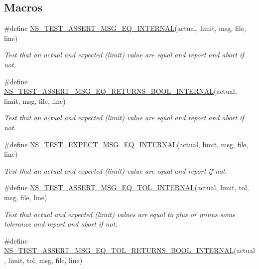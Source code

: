 \subsection*{Macros}
\begin{DoxyCompactItemize}
\item 
\#define \hyperlink{group__testingimpl_gaa9d54a0bd3ffaa7f4db82c4a6c1fb83b}{N\+S\+\_\+\+T\+E\+S\+T\+\_\+\+A\+S\+S\+E\+R\+T\+\_\+\+M\+S\+G\+\_\+\+E\+Q\+\_\+\+I\+N\+T\+E\+R\+N\+AL}(actual,  limit,  msg,  file,  line)
\begin{DoxyCompactList}\small\item\em Test that an actual and expected (limit) value are equal and report and abort if not. \end{DoxyCompactList}\item 
\#define \hyperlink{group__testingimpl_gaa154d45ddff16a28ea0a9f3fe890591d}{N\+S\+\_\+\+T\+E\+S\+T\+\_\+\+A\+S\+S\+E\+R\+T\+\_\+\+M\+S\+G\+\_\+\+E\+Q\+\_\+\+R\+E\+T\+U\+R\+N\+S\+\_\+\+B\+O\+O\+L\+\_\+\+I\+N\+T\+E\+R\+N\+AL}(actual,  limit,  msg,  file,  line)
\begin{DoxyCompactList}\small\item\em Test that an actual and expected (limit) value are equal and report and abort if not. \end{DoxyCompactList}\item 
\#define \hyperlink{group__testingimpl_gaf35a8f7e8a9a1eb011fa6fb33ea721a3}{N\+S\+\_\+\+T\+E\+S\+T\+\_\+\+E\+X\+P\+E\+C\+T\+\_\+\+M\+S\+G\+\_\+\+E\+Q\+\_\+\+I\+N\+T\+E\+R\+N\+AL}(actual,  limit,  msg,  file,  line)
\begin{DoxyCompactList}\small\item\em Test that an actual and expected (limit) value are equal and report if not. \end{DoxyCompactList}\item 
\#define \hyperlink{group__testingimpl_ga48c926819b2c033fb5a4c97177efbed7}{N\+S\+\_\+\+T\+E\+S\+T\+\_\+\+A\+S\+S\+E\+R\+T\+\_\+\+M\+S\+G\+\_\+\+E\+Q\+\_\+\+T\+O\+L\+\_\+\+I\+N\+T\+E\+R\+N\+AL}(actual,  limit,  tol,  msg,  file,  line)
\begin{DoxyCompactList}\small\item\em Test that actual and expected (limit) values are equal to plus or minus some tolerance and report and abort if not. \end{DoxyCompactList}\item 
\#define \hyperlink{group__testingimpl_ga1fd0b56967248280afec4b3ea83199b3}{N\+S\+\_\+\+T\+E\+S\+T\+\_\+\+A\+S\+S\+E\+R\+T\+\_\+\+M\+S\+G\+\_\+\+E\+Q\+\_\+\+T\+O\+L\+\_\+\+R\+E\+T\+U\+R\+N\+S\+\_\+\+B\+O\+O\+L\+\_\+\+I\+N\+T\+E\+R\+N\+AL}(actual,  limit,  tol,  msg,  file,  line)

\end{DoxyCompactItemize}
